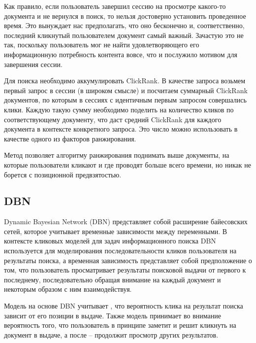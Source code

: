\documentclass[diploma]{nanolab2015}
\begin{document}
Как правило, если пользователь завершил сессию на просмотре какого-то документа и не вернулся в поиск, то нельзя достоверно установить проведенное время. Это вынуждает нас предполагать, что оно бесконечно и, соответственно, последний кликнутый пользователем документ самый важный. Зачастую это не так, поскольку пользователь мог не найти удовлетворяющего его информационную потребность контента вовсе, что и послужило мотивом для завершения сессии.

Для поиска необходимо аккумулировать ClickRank. В качестве запроса возьмем первый запрос в сессии (в широком смысле) и посчитаем суммарный ClickRank документов, по которым в сессиях с идентичным первым запросом совершались клики. Каждую такую сумму необходимо поделить на количество кликов по соответствующему документу, что даст средний ClickRank для каждого документа в контексте конкретного запроса. Это число можно использовать в качестве одного из факторов ранжирования.

Метод позволяет алгоритму ранжирования поднимать выше документы, на которые пользователи кликают и где проводят больше всего времени, но никак не борется с позиционной предвзятостью.

\subsection{DBN}
Dynamic Bayesian Network (DBN) представляет собой расширение байесовских сетей, которое учитывает временные зависимости между переменными. В контексте кликовых моделей для задач информационного поиска DBN используется для моделирования последовательности кликов пользователя на результаты поиска, а временная зависимость представляет собой предположение о том, что пользователь просматривает результаты поисковой выдачи от первого к последнему, последовательно обращая внимание на каждый документ и некоторым образом с ним взаимодействуя.

Модель на основе DBN учитывает \cite{DBN}, что вероятность клика на результат поиска зависит от его позиции в выдаче. Также модель принимает во внимание вероятность того, что пользователь в принципе заметит и решит кликнуть на документ в выдаче, а после -- продолжит просмотр других результатов.
\end{document}
